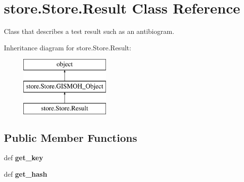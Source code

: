 \hypertarget{classstore_1_1_store_1_1_result}{\section{store.\-Store.\-Result Class Reference}
\label{classstore_1_1_store_1_1_result}
}


Class that describes a test result such as an antibiogram.  


Inheritance diagram for store.\-Store.\-Result\-:\begin{figure}[H]
\begin{center}
\leavevmode
\includegraphics[height=3.000000cm]{classstore_1_1_store_1_1_result}
\end{center}
\end{figure}
\subsection*{Public Member Functions}
\begin{DoxyCompactItemize}
\item 
\hypertarget{classstore_1_1_store_1_1_result_a6f0d5d1bc4a54bf6d2633f1e3b21e8bd}{def {\bfseries get\-\_\-key}}\label{classstore_1_1_store_1_1_result_a6f0d5d1bc4a54bf6d2633f1e3b21e8bd}

\item 
\hypertarget{classstore_1_1_store_1_1_result_a42cdbea348744730bbb100ab66e6d638}{def {\bfseries get\-\_\-hash}}\label{classstore_1_1_store_1_1_result_a42cdbea348744730bbb100ab66e6d638}

\end{DoxyCompactItemize}
